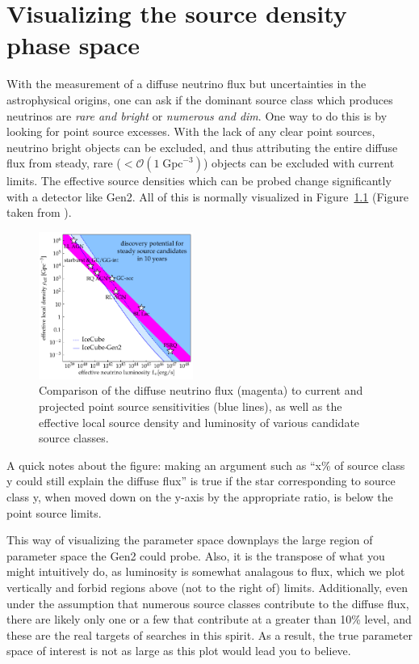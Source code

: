 \chapter{Visualizing the source density phase space}
With the measurement of a diffuse neutrino flux but uncertainties in the astrophysical origins, one can ask if the dominant source class which produces neutrinos are \textit{rare and bright} or \textit{numerous and dim}. One way to do this is by looking for point source excesses. With the lack of any clear point sources, neutrino bright objects can be excluded, and thus attributing the entire diffuse flux from steady, rare ($<\mathcal{O}(1\; \mathrm{Gpc}^{-3})$) objects can be excluded with current limits. The effective source densities which can be probed change significantly with a detector like Gen2. All of this is normally visualized in Figure~\ref{fig:current_fig} (Figure taken from \cite{Aartsen:2019swn}).

\begin{figure}[h!]
    \centering
    \includegraphics[width=0.45\textwidth]{images/continuous_Gen2_revised.pdf}
    \caption{Comparison of the diffuse neutrino flux (magenta) to current and projected point source sensitivities (blue lines), as well as the effective local source density and luminosity of various candidate source classes.}
    \label{fig:current_fig}
\end{figure}

A quick notes about the figure: making an argument such as ``x\% of source class y could still explain the diffuse flux'' is true if the star corresponding to source class y, when moved down on the y-axis by the appropriate ratio, is below the point source limits.

This way of visualizing the parameter space downplays the large region of parameter space the Gen2 could probe. Also, it is the transpose of what you might intuitively do, as luminosity is somewhat analagous to flux, which we plot vertically and forbid regions above (not to the right of) limits. Additionally, even under the assumption that numerous source classes contribute to the diffuse flux, there are likely only one or a few that contribute at a greater than 10\% level, and these are the real targets of searches in this spirit. As a result, the true parameter space of interest is not as large as this plot would lead you to believe. 

